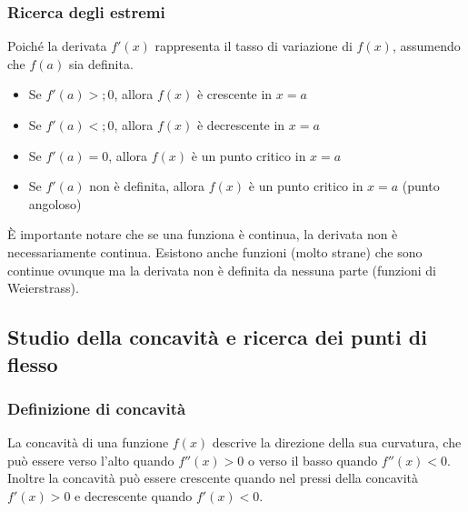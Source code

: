 \documentclass{article}
\begin{document}
\subsubsection{Ricerca degli estremi}
Poiché la derivata \(f'(x)\) rappresenta il tasso di variazione di \(f(x)\), assumendo che
\(f(a)\) sia definita.

\begin{itemize}
    \item Se \(f'(a) >; 0\), allora \(f(x)\) è crescente in \(x = a\)
    \item Se \(f'(a) <; 0\), allora \(f(x)\) è decrescente in \(x = a\)
    \item Se \(f'(a) = 0\), allora \(f(x)\) è un punto critico in \(x = a\)
    \item Se \(f'(a)\) non è definita, allora \(f(x)\) è un punto critico in \(x = a\)
    (punto angoloso)
\end{itemize}

È importante notare che se una funziona è continua, la derivata non è necessariamente continua.
Esistono anche funzioni (molto strane) che sono continue ovunque ma la derivata non è definita da nessuna parte
(funzioni di Weierstrass).

\newpage
\subsection{Studio della concavità e ricerca dei punti di flesso}
\subsubsection{Definizione di concavità}

La concavità di una funzione \(f(x)\) descrive la direzione della sua curvatura, che può
essere verso l'alto quando \(f''(x)>0\) o verso il basso quando \(f''(x)<0\).\\
Inoltre la concavità può essere crescente quando nel pressi della concavità \(f'(x)>0\) e 
decrescente quando \(f'(x)<0\).
\end{document}

